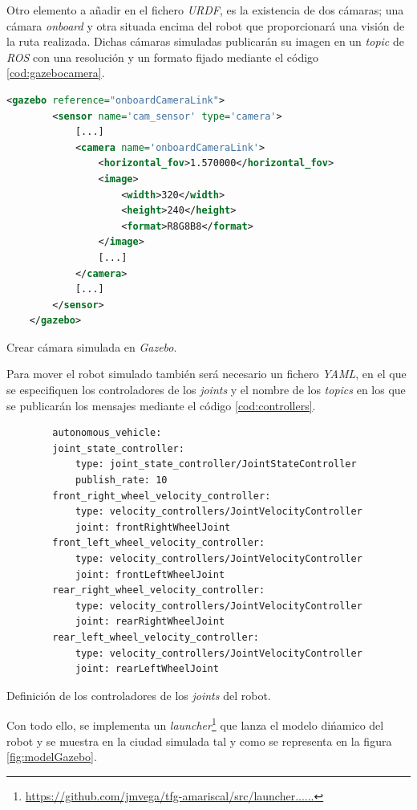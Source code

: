 Otro elemento a añadir en el fichero \textit{URDF}, es la existencia de dos cámaras; una cámara \textit{onboard} y otra situada encima del robot que proporcionará una visión de la
ruta realizada. Dichas cámaras simuladas publicarán su imagen en un \textit{topic} de \textit{ROS} con una resolución y un formato fijado mediante el código \ref{cod:gazebocamera}.\\

\begin{code}[h]
	\begin{lstlisting}[language=XML]
	<gazebo reference="onboardCameraLink">
		<sensor name='cam_sensor' type='camera'>
			[...]
			<camera name='onboardCameraLink'>
				<horizontal_fov>1.570000</horizontal_fov>
				<image>
					<width>320</width>
					<height>240</height>
					<format>R8G8B8</format>
				</image>
				[...]
			</camera>
			[...]
		</sensor>
	</gazebo>
	\end{lstlisting}
	\caption[Crear cámara simulada en \textit{Gazebo}.]{Crear cámara simulada en \textit{Gazebo}.}
	\label{cod:gazebocamera}
\end{code}

Para mover el robot simulado también será necesario un fichero \textit{YAML}, en el que se especifiquen los controladores de los \textit{joints} y el nombre de los \textit{topics} en los que se publicarán los mensajes mediante el código \ref{cod:controllers}.\\

\begin{code}[h]
	\begin{lstlisting}
		autonomous_vehicle:
		joint_state_controller:
			type: joint_state_controller/JointStateController
			publish_rate: 10
		front_right_wheel_velocity_controller:
			type: velocity_controllers/JointVelocityController
			joint: frontRightWheelJoint
		front_left_wheel_velocity_controller:
			type: velocity_controllers/JointVelocityController
			joint: frontLeftWheelJoint
		rear_right_wheel_velocity_controller:
			type: velocity_controllers/JointVelocityController
			joint: rearRightWheelJoint
		rear_left_wheel_velocity_controller:
			type: velocity_controllers/JointVelocityController
			joint: rearLeftWheelJoint
	\end{lstlisting}
	\caption[Definición de los controladores de los \textit{joints} del robot.]{Definición de los controladores de los \textit{joints} del robot.}
	\label{cod:controllers}
\end{code}

Con todo ello, se implementa un \textit{launcher}\footnote{\url{https://github.com/jmvega/tfg-amariscal/src/launcher......}} que lanza el modelo dińamico del robot y se muestra en la ciudad simulada tal y como se representa en la figura \ref{fig:modelGazebo}.\\

